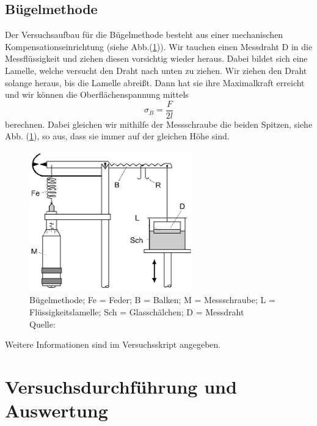 \documentclass[bibliography=totocnumbered]{scrartcl}
\begin{document}
	
	
	\subsection{Bügelmethode} \label{sect: Bügelmethode}
	Der Versuchsaufbau für die Bügelmethode besteht aus einer mechanischen Kompensationseinrichtung (siehe Abb.(\ref{Abb: Versuchsaufbau Bügelmethode})). Wir tauchen einen Messdraht D in die Messflüssigkeit und ziehen diesen vorsichtig wieder heraus. Dabei bildet sich eine Lamelle, welche versucht den Draht nach unten zu ziehen. Wir ziehen den Draht solange heraus, bis die Lamelle abreißt. Dann hat sie ihre Maximalkraft erreicht und wir können die Oberflächenspannung mittels 
	\begin{equation}\label{eq: Bügelmethode}
		\sigma_{B}=\dfrac{F}{2l}
	\end{equation}
	berechnen. Dabei gleichen wir mithilfe der Messschraube die beiden Spitzen, siehe Abb. (\ref{Abb: Versuchsaufbau Bügelmethode}), so aus, dass sie immer auf der gleichen Höhe sind.
	
	
	\begin{figure}[ht!]
		\centering
		\includegraphics[width=200pt]{fotos/gpr1/screenshot001}
		\caption[Bügelmethode]{Bügelmethode; Fe = Feder; B = Balken; M = Messschraube; L = Flüssigkeitslamelle; Sch = Glasschälchen; D = Messdraht\\ Quelle: \cite{Muller.f}}
		\label{Abb: Versuchsaufbau Bügelmethode}
	\end{figure}
	Weitere Informationen sind im Versuchsskript\smartcite{Muller.f} angegeben.
	
	
	
	\newpage
	\section{Versuchsdurchführung und Auswertung}
		
\end{document}
